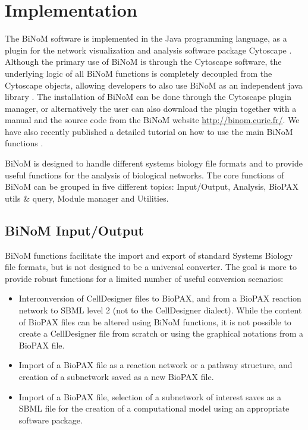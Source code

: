 \documentclass[10pt]{bmc_article}
\newenvironment{bmcformat}{\baselineskip20pt\sloppy\setboolean{publ}{false}}{\baselineskip20pt\sloppy}
\begin{document}
\begin{bmcformat}
\section*{Implementation}
The BiNoM software is implemented in the Java programming language, as a plugin
for the network visualization and analysis software package Cytoscape
\cite{cline2007integration}. Although the primary use of BiNoM is through the
Cytoscape software, the underlying logic of all BiNoM functions is completely
decoupled from the Cytoscape objects, allowing developers to also use BiNoM as
an independent java library \cite{zinovyev2008binom}. The installation of BiNoM
can be done through the Cytoscape plugin manager, or alternatively the user can
also download
the plugin together with a manual and the source code from the BiNoM website
\url{http://binom.curie.fr/}. We have also recently published a 
detailed tutorial on how to use the main BiNoM functions
\cite{binomBookChapter}.


BiNoM is designed to handle different systems biology file formats and to
provide useful functions for the analysis of biological networks. The core
functions of BiNoM can be grouped in five different topics: Input/Output,
Analysis, BioPAX utils \& query, Module manager and Utilities.


\subsection*{BiNoM Input/Output}

BiNoM functions facilitate the import and export of standard Systems Biology
file formats, but is not designed to be a universal converter. The goal is more
to provide robust functions for a limited number of useful conversion
scenarios: 

\begin{itemize}

\item Interconversion of CellDesigner files to BioPAX, and from a BioPAX
reaction network to SBML level 2 (not to the CellDesigner dialect). While the
content of BioPAX files can be altered using BiNoM functions, it is not possible
to create a CellDesigner file from scratch or using the graphical notations from
a BioPAX file. 

\item Import of a BioPAX file as a
reaction network or a pathway structure, and creation of a subnetwork saved as a new BioPAX file. 

\item Import of a BioPAX file, selection of a subnetwork of interest saves as a SBML file for
the creation of a computational model using an appropriate software package.


\end{itemize}
\end{bmcformat}
\end{document}

